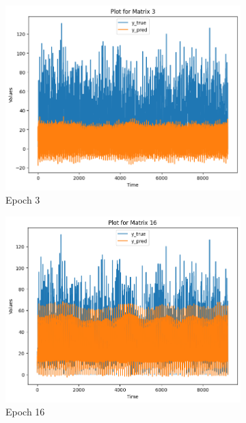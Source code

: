 \documentclass[a4paper, article, oneside, USenglish, IN5460]{memoir}
\begin{document}
\begin{figure}
        \centering
        \begin{subfigure}[b]{0.475\textwidth}
            \centering
            \includegraphics[width=\textwidth]{figures/LSTM-Pred/plot3.png}
            {{\small Epoch 3}}    
        \end{subfigure}
        \hfill
        \begin{subfigure}[b]{0.475\textwidth}  
            \centering 
            \includegraphics[width=\textwidth]{figures/LSTM-Pred/plot16.png}
            {{\small Epoch 16}}    
        \end{subfigure}

\end{figure}
\end{document}

